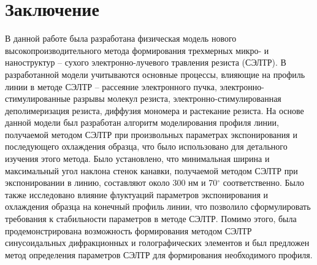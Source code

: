 \chapter*{Заключение}
В данной работе была разработана физическая модель нового высокопроизводительного метода формирования трехмерных микро- и наноструктур -- сухого электронно-лучевого травления резиста (СЭЛТР).
В разработанной модели учитываются основные процессы, влияющие на профиль линии в методе СЭЛТР -- рассеяние электронного пучка, электронно-стимулированные разрывы молекул резиста, электронно-стимулированная деполимеризация резиста, диффузия мономера и растекание резиста.
На основе данной модели был разработан алгоритм моделирования профиля линии, получаемой методом СЭЛТР при произвольных параметрах экспонирования и последующего охлаждения образца, что было использовано для детального изучения этого метода.
Было установлено, что минимальная ширина и максимальный угол наклона стенок канавки, получаемой методом СЭЛТР при экспонировании в линию, составляют около 300 нм и 70$^\circ$ соответственно.
Было также исследовано влияние флуктуаций параметров экспонирования и охлаждения образца на конечный профиль линии, что позволило сформулировать требования к стабильности параметров в методе СЭЛТР.
Помимо этого, была продемонстрирована возможность формирования методом СЭЛТР синусоидальных дифракционных и голографических элементов и был предложен метод определения параметров СЭЛТР для формирования необходимого профиля.

